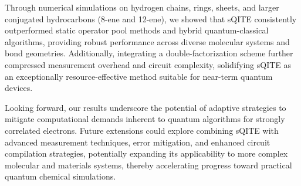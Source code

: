 \documentclass[aip,jcp,amsmath,amssymb, reprint]{revtex4-1}
\begin{document}
Through numerical simulations on hydrogen chains, rings, sheets, and larger conjugated hydrocarbons (8-ene and 12-ene), we showed that sQITE consistently outperformed static operator pool methods and hybrid quantum-classical algorithms, providing robust performance across diverse molecular systems and bond geometries. Additionally, integrating a double-factorization scheme further compressed measurement overhead and circuit complexity, solidifying sQITE as an exceptionally resource-effective method suitable for near-term quantum devices.

Looking forward, our results underscore the potential of adaptive strategies to mitigate computational demands inherent to quantum algorithms for strongly correlated electrons. Future extensions could explore combining sQITE with advanced measurement techniques, error mitigation, and enhanced circuit compilation strategies, potentially expanding its applicability to more complex molecular and materials systems, thereby accelerating progress toward practical quantum chemical simulations.


\end{document}
